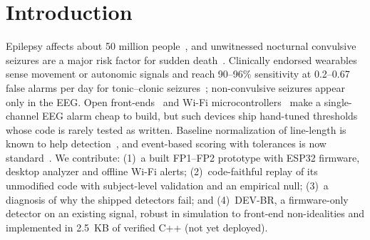 \documentclass[conference,letterpaper]{IEEEtran}
\begin{document}
\section{Introduction}
Epilepsy affects about 50 million people~\cite{who2024epilepsy}, and unwitnessed nocturnal convulsive seizures are a major risk factor for sudden death~\cite{devinsky2016sudep}. Clinically endorsed wearables sense movement or autonomic signals and reach 90--96\% sensitivity at 0.2--0.67 false alarms per day for tonic--clonic seizures~\cite{beniczky2021guideline}; non-convulsive seizures appear only in the EEG. Open front-ends~\cite{bioamp} and Wi-Fi microcontrollers~\cite{esp32} make a single-channel EEG alarm cheap to build, but such devices ship hand-tuned thresholds whose code is rarely tested as written. Baseline normalization of line-length is known to help detection~\cite{logesparan2011norm}, and event-based scoring with tolerances is now standard~\cite{dan2025szcore}. We contribute: (1)~a built FP1--FP2 prototype with ESP32 firmware, desktop analyzer and offline Wi-Fi alerts; (2)~code-faithful replay of its unmodified code with subject-level validation and an empirical null; (3)~a diagnosis of why the shipped detectors fail; and (4)~DEV-BR, a firmware-only detector on an existing signal, robust in simulation to front-end non-idealities and implemented in 2.5~KB of verified C++ (not yet deployed).
\end{document}

